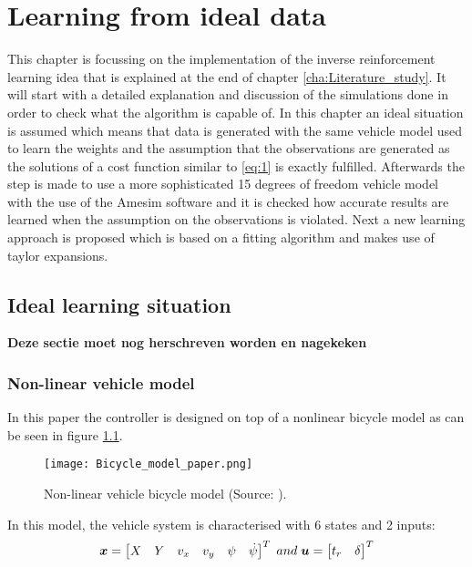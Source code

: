 \chapter{Learning from ideal data\\}
\label{cha:Learning_algorithm}

This chapter is focussing on the implementation of the inverse reinforcement learning idea that is explained at the end of chapter \ref{cha:Literature_study}. It will start with a detailed explanation and discussion of the simulations done in order to check what the algorithm is capable of. In this chapter an ideal situation is assumed which means that data is generated with the same vehicle model used to learn the weights and the assumption that the observations are generated as the solutions of a cost function similar to \ref{eq:1} is exactly fulfilled. Afterwards the step is made to use a more sophisticated 15 degrees of freedom vehicle model with the use of the Amesim software and it is checked how accurate results are learned when the assumption on the observations is violated. Next a new learning approach is proposed which is based on a fitting algorithm and makes use of taylor expansions. 

\section{Ideal learning situation }

\textbf{Deze sectie moet nog herschreven worden en nagekeken}

\subsection{Non-linear vehicle model}\label{sec:Vehicle_models}
In this paper the controller is designed on top of a nonlinear bicycle model \cite{TongDuySon2019} as can be seen in figure \ref{fig:bicycle_model}.\\

\begin{figure}[h!]
	\centering
	\texttt{[image: Bicycle\_model\_paper.png]}
	\caption{Non-linear vehicle bicycle model (Source: \cite{TongDuySon2019}).}
	\label{fig:bicycle_model}
\end{figure}

In this model, the vehicle system is characterised with 6 states and 2 inputs:
\begin{equation}\label{eq:bicycle_model}
\centering
\bm{x} = 
\begin{bmatrix}
X & Y & v_x & v_y & \psi & \dot{\psi}
\end{bmatrix}^{T}
\; and \; \bm{u} = 
\begin{bmatrix}
t_r & \delta
\end{bmatrix}^{T}
\end{equation}

